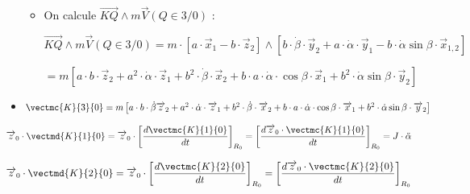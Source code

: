 \begin{multicols}{2}
\begin{corrige}
\begin{itemize}
\begin{itemize}
\item On calcule $\overrightarrow{KQ}\wedge m\overrightarrow{V}(Q\in 3/0)$ : 

$\overrightarrow{KQ}\wedge m\overrightarrow{V}(Q\in 3/0)=m\cdot \left[a\cdot \overrightarrow{x}_1-b\cdot \overrightarrow{z}_2\right]\wedge\left[b\cdot \dot{\beta}\cdot \overrightarrow{y}_2+a\cdot \dot{\alpha}\cdot \overrightarrow{y}_1-b\cdot\dot{\alpha} \sin\beta\cdot \overrightarrow{x}_{1,2}\right]$

$=m\left[a\cdot b\cdot \overrightarrow{z}_2+a^2\cdot \dot{\alpha}\cdot\overrightarrow{z}_1+b^2\cdot \dot{\beta}\cdot\overrightarrow{x}_2+b\cdot a\cdot \dot{\alpha}\cdot \cos\beta\cdot \overrightarrow{x}_1+b^2\cdot \dot{\alpha}\sin\beta\cdot \overrightarrow{y}_2\right]
$
\end{itemize}

\item
$
\vectmc{K}{3}{0}=m\left[a\cdot b\cdot\dot{\beta} \overrightarrow{z}_2+a^2\cdot \dot{\alpha}\cdot\overrightarrow{z}_1+b^2\cdot \dot{\beta}\cdot\overrightarrow{x}_2+b\cdot a\cdot \dot{\alpha}\cdot \cos\beta\cdot \overrightarrow{x}_1+b^2\cdot \dot{\alpha}\sin\beta\cdot \overrightarrow{y}_2\right]
$

\end{itemize}

\end{corrige}
\else
\fi



\ifprof
\begin{corrige}
\begin{align*}
\overrightarrow{z}_0\cdot \vectmd{K}{1}{0}=\overrightarrow{z}_0\cdot\left[\frac{d\vectmc{K}{1}{0}}{dt}\right]_{R_0}
=\left[\frac{d\overrightarrow{z}_0\cdot\vectmc{K}{1}{0}}{dt}\right]_{R_0}=J\cdot \ddot{\alpha}
\end{align*}
\end{corrige}
\else
\fi



\ifprof
\begin{corrige}
\begin{align*}
\overrightarrow{z}_0\cdot \vectmd{K}{2}{0}=\overrightarrow{z}_0\cdot\left[\frac{d\vectmc{K}{2}{0}}{dt}\right]_{R_0}
=\left[\frac{d\overrightarrow{z}_0\cdot\vectmc{K}{2}{0}}{dt}\right]_{R_0}
\end{align*}


\end{corrige}
\end{multicols}
